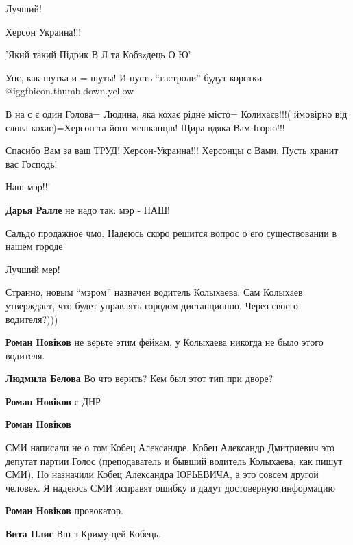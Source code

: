 \begin{itemize}
Лучший!

Херсон Украина!!!


'Який такий Підрик В Л та Кобзzдець О Ю'

Упс, как шутка и = шуты! И пусть \enquote{гастроли} будут коротки @igg{fbicon.thumb.down.yellow} 

В на с є один Голова= Людина, яка кохає рідне місто= Колихаєв!!!( ймовірно від
слова кохає)=Херсон та його мешканців! Щира вдяка Вам Ігорю!!!

Спасибо Вам за ваш ТРУД! Херсон-Украина!!! Херсонцы с Вами. Пусть хранит вас Господь!

Наш мэр!!!

\textbf{Дарья Ралле} не надо так: мэр - НАШ!

Сальдо продажное чмо. Надеюсь скоро решится вопрос о его существовании в нашем городе

Лучший мер!


Странно, новым \enquote{мэром} назначен водитель Колыхаева. Сам Колыхаев утверждает,
что будет управлять городом дистанционно. Через своего водителя?)))

\begin{itemize} %
\textbf{Роман Новіков} не верьте этим фейкам, у Колыхаева никогда не было этого водителя.

\textbf{Людмила Белова} Во что верить? Кем был этот тип при дворе?

\textbf{Роман Новіков} с ДНР

\textbf{Роман Новіков} 

СМИ написали не о том Кобец Александре. Кобец Александр Дмитриевич это депутат
партии Голос (преподаватель и бывший водитель Колыхаева, как пишут СМИ). Но
назначили Кобец Александра ЮРЬЕВИЧА, а это совсем другой человек. Я надеюсь СМИ
исправят ошибку и дадут достоверную информацию

\textbf{Роман Новіков} провокатор.

\textbf{Вита Плис} Він з Криму цей Кобець.
\end{itemize} %



\end{itemize}
